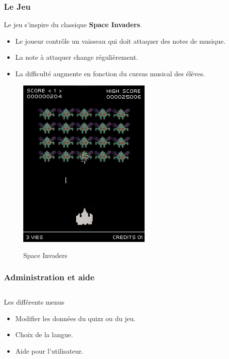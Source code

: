 \begin{frame}
  \frametitle{Le Jeu}
  Le jeu s'inspire du classique \textbf{Space Invaders}.
  \begin{itemize}
    \item Le joueur contrôle un vaisseau qui doit attaquer des notes de musique.    
    \item La note à attaquer change régulièrement.
    \item La difficulté augmente en fonction du cursus musical des élèves.  
  \end{itemize}

  \begin{figure}[!h]
    \centering
    \includegraphics[height = 0.5\textheight]{img/Space_Invaders.png}
    \label{Space Invaders} 
    \caption{Space Invaders}
  \end{figure}
\end{frame}

\begin{frame}
  \frametitle{Administration et aide}
 \begin{columns}[t]
    \begin{column}{10cm}
      \begin{exampleblock}{Les différents menus}
	\begin{itemize}
        \item Modifier les données du quizz ou du jeu.
        \item Choix de la langue.
        \item Aide pour l'utilisateur.
        \end{itemize}
      \end{exampleblock} 
    \end{column}
  \end{columns}  
\end{frame}
